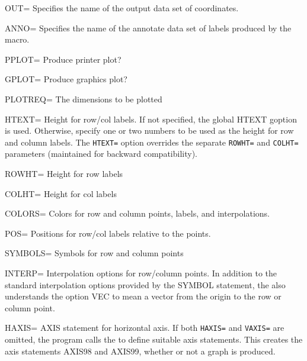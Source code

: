 \begin{proglist}
\item[OUT=]
Specifies the name of the output data set of coordinates.

\item[ANNO=]
Specifies the name of the annotate data set of labels
produced by the macro.  

\item[PPLOT=]
Produce printer plot? 

\item[GPLOT=]
Produce graphics plot? 

\item[PLOTREQ=]
The dimensions to be plotted 

\item[HTEXT=]
Height for row/col labels.  If not specified, the global
HTEXT goption is used.  Otherwise, specify one or two numbers
to be used as the height for row and column labels.
The \texttt{HTEXT=} option overrides the separate \texttt{ROWHT=} and \texttt{COLHT=}
parameters (maintained for backward compatibility).

\item[ROWHT=]
Height for row labels

\item[COLHT=]
Height for col labels

\item[COLORS=]
Colors for row and column points, labels, and interpolations.

\item[POS=]
Positions for row/col labels relative to the points.

\item[SYMBOLS=]
Symbols for row and column points 

\item[INTERP=]
Interpolation options for row/column points. In addition to the
standard interpolation options provided by the SYMBOL statement,
the  also understands the option VEC to mean
a vector from the origin to the row or column point. 

\item[HAXIS=]
AXIS statement for horizontal axis.  If both \texttt{HAXIS=} and
\texttt{VAXIS=} are omitted, the program calls the  to
define suitable axis statements.  This creates the axis
statements AXIS98 and AXIS99, whether or not a graph
is produced.


\end{proglist}
